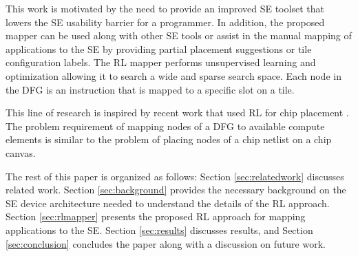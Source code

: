 This work is motivated by the need to provide an improved SE toolset that lowers the SE usability barrier for a programmer.
In addition, the proposed mapper can be used along with other SE tools or assist in the manual mapping of applications to the SE by providing partial placement suggestions or tile configuration labels.
The RL mapper performs unsupervised learning and optimization allowing it to search a wide and sparse search space. 
Each node in the DFG is an instruction that is mapped to a specific slot on a tile.

This line of research is inspired by recent work that used RL for chip placement \cite{mirhoseini2020chip}.
The problem requirement of mapping nodes of a DFG to available compute elements is similar to the problem of placing nodes of a chip netlist on a chip canvas. 

The rest of this paper is organized as follows: 
Section \ref{sec:relatedwork} discusses related work.
Section \ref{sec:background} provides the necessary background on the SE device architecture needed to understand the details of the RL approach.
Section \ref{sec:rlmapper} presents the proposed RL approach for mapping applications to the SE.
Section \ref{sec:results} discusses results, and Section \ref{sec:conclusion} concludes the paper along with a discussion on future work.